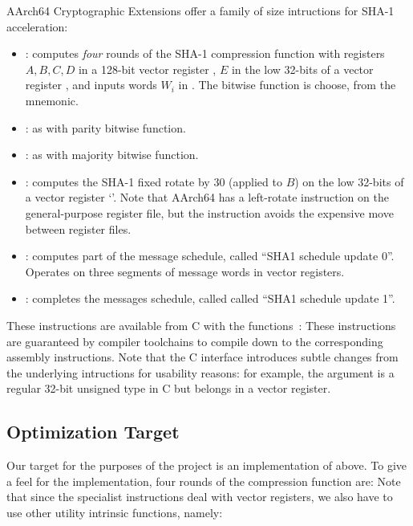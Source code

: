 AArch64 Cryptographic Extensions offer a family of size intructions for SHA-1
acceleration:
%
\begin{itemize}
    \item {}:
        computes \emph{four} rounds of the SHA-1 compression function with
        registers $A,B,C,D$ in a 128-bit vector register , $E$ in the
        low 32-bits of a vector register , and inputs words $W_i$ in
        . The bitwise function is choose, from the  mnemonic.
    \item {}:
        as  with parity bitwise function.
    \item {}:
        as  with majority bitwise function.
    \item {}:
        computes the SHA-1 fixed rotate by 30 (applied to $B$) on the low
        32-bits of a vector register `'. Note that AArch64 has a
        left-rotate instruction on the general-purpose register file, but the
         instruction avoids the expensive move between register
        files.
    \item {}:
        computes part of the message schedule, called ``SHA1 schedule update
        0''. Operates on three segments of message words in vector registers.
    \item {}:
        completes the messages schedule, called called ``SHA1 schedule update
        1''.
\end{itemize}

These instructions are available from C with the 
functions~\cite{arm-neon-sha}:
%
%
These instructions are guaranteed by compiler toolchains to compile down to the
corresponding assembly instructions.  Note that the C interface introduces
subtle changes from the underlying intructions for usability reasons: for
example, the  argument is a regular 32-bit unsigned type in C but
belongs in a vector register.

\subsection{Optimization Target}

Our target for the purposes of the project is an implementation of
 above. To give a feel for the implementation, four rounds of the
compression function are:
%
%
Note that since the specialist instructions deal with vector registers, we also
have to use other utility intrinsic functions, namely:
%

